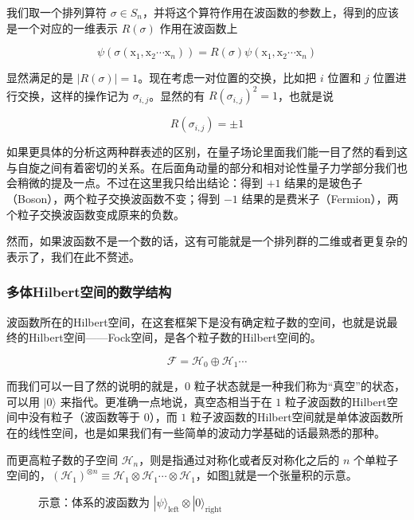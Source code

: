 我们取一个排列算符 $\sigma\in S_n$，并将这个算符作用在波函数的参数上，得到的应该是一个对应的一维表示 $R(\sigma)$ 作用在波函数上

\begin{equation}
\psi(\sigma ({\mathrm x}_1, {\mathrm x}_2\cdots{\mathrm x}_n)) = R(\sigma)\psi({\mathrm x}_1, {\mathrm x}_2\cdots{\mathrm x}_n)
\end{equation}

显然满足的是 $|R(\sigma)| = 1$。现在考虑一对位置的交换，比如把 $i$ 位置和 $j$ 位置进行交换，这样的操作记为 $\sigma_{i,j}$。显然的有 $R(\sigma_{i,j})^2 = 1$，也就是说

\begin{equation}
R(\sigma_{i,j}) = \pm 1
\end{equation}

如果更具体的分析这两种群表述的区别，在量子场论里面我们能一目了然的看到这与自旋之间有着密切的关系。在后面角动量的部分和相对论性量子力学部分我们也会稍微的提及一点。不过在这里我只给出结论：得到 $+1$ 结果的是玻色子（Boson），两个粒子交换波函数不变；得到 $-1$ 结果的是费米子（Fermion），两个粒子交换波函数变成原来的负数。

然而，如果波函数不是一个数的话，这有可能就是一个排列群的二维或者更复杂的表示了，我们在此不赘述。

\subsubsection{多体Hilbert空间的数学结构}

波函数所在的Hilbert空间，在这套框架下是没有确定粒子数的空间，也就是说最终的Hilbert空间——Fock空间，是各个粒子数的Hilbert空间的。

\begin{equation}
\mathcal{F} = \mathcal{H}_0 \oplus \mathcal{H}_1\cdots
\end{equation}

而我们可以一目了然的说明的就是，$0$ 粒子状态就是一种我们称为“真空”的状态，可以用 $|0\rangle$ 来指代。更准确一点地说，真空态相当于在 $1$ 粒子波函数的Hilbert空间中没有粒子（波函数等于 $0$），而 $1$ 粒子波函数的Hilbert空间就是单体波函数所在的线性空间，也是如果我们有一些简单的波动力学基础的话最熟悉的那种。

而更高粒子数的子空间 $\mathcal{H}_n$，则是指通过对称化或者反对称化之后的 $n$ 个单粒子空间的，$(\mathcal{H}_1)^{\otimes n} \equiv \mathcal{H}_1\otimes \mathcal{H}_1\cdots\otimes\mathcal{H}_1$，如图{\ref{Fig2.1}}就是一个张量积的示意。

\begin{figure}[h]
\centering
{}
\caption{示意：体系的波函数为 $|\psi\rangle_\text{left}\otimes|0\rangle_\text{right}$}\label{Fig2.1}
\end{figure}

